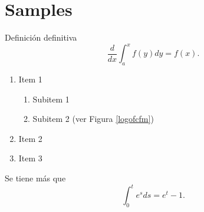 \chapter{Samples}

\lipsum[1-2]

\begin{defn} Definición definitiva $$\frac{d}{dx}\int_a^xf(y)dy=f(x).$$\end{defn}

\lipsum[30-35]
\begin{enumerate}
	\item Item 1
	\begin{enumerate}
		\item Subitem 1
		\item Subitem 2 (ver Figura \ref{logofcfm})
	\end{enumerate}
	\item Item 2
	\item Item 3
\end{enumerate}
\begin{teo}
	Se tiene más que $$\int_0^t e^sds=e^t-1.$$
\end{teo}
\lipsum[36-40]